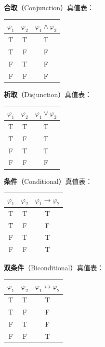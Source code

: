 \documentclass[UTF8,11pt,a4paper]{ctexbook}   %
\theoremstyle{definition}
\begin{document}
\textbf{合取}（Conjunction）真值表：
\begin{table}[htbp]
\centering
\begin{tabular}{|c|c|c|}
\hline
$\varphi_1$ & $\varphi_2$ & $\varphi_1 \land \varphi_2$ \\
\hline
T & T & T \\
T & F & F \\
F & T & F \\
F & F & F \\
\hline
\end{tabular}
\end{table}

\textbf{析取}（Disjunction）真值表：
\begin{table}[htbp]
\centering
\begin{tabular}{|c|c|c|}
\hline
$\varphi_1$ & $\varphi_2$ & $\varphi_1 \lor \varphi_2$ \\
\hline
T & T & T \\
T & F & T \\
F & T & T \\
F & F & F \\
\hline
\end{tabular}
\end{table}

\textbf{条件}（Conditional）真值表：
\begin{table}[htbp]
\centering
\begin{tabular}{|c|c|c|}
\hline
$\varphi_1$ & $\varphi_2$ & $\varphi_1 \rightarrow \varphi_2$ \\
\hline
T & T & T \\
T & F & F \\
F & T & T \\
F & F & T \\
\hline
\end{tabular}
\end{table}

\textbf{双条件}（Biconditional）真值表：
\begin{table}[htbp]
\centering
\begin{tabular}{|c|c|c|}
\hline
$\varphi_1$ & $\varphi_2$ & $\varphi_1 \leftrightarrow \varphi_2$ \\
\hline
T & T & T \\
T & F & F \\
F & T & F \\
F & F & T \\
\hline
\end{tabular}
\end{table}
\end{document}
